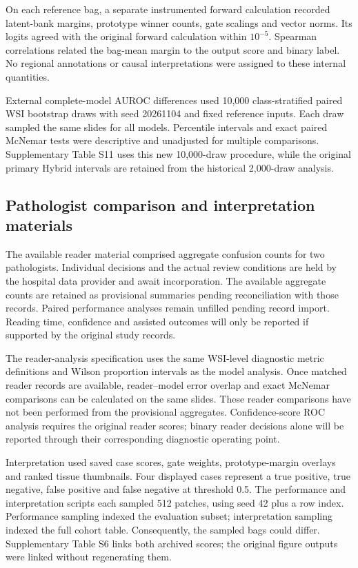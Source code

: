 On each reference bag, a separate instrumented forward calculation recorded latent-bank margins, prototype winner counts, gate scalings and vector norms. Its logits agreed with the original forward calculation within $10^{-5}$. Spearman correlations related the bag-mean margin to the output score and binary label. No regional annotations or causal interpretations were assigned to these internal quantities.

External complete-model AUROC differences used 10,000 class-stratified paired WSI bootstrap draws with seed 20261104 and fixed reference inputs. Each draw sampled the same slides for all models. Percentile intervals and exact paired McNemar tests were descriptive and unadjusted for multiple comparisons. Supplementary Table S11 uses this new 10,000-draw procedure, while the original primary Hybrid intervals are retained from the historical 2,000-draw analysis.


\subsection{Pathologist comparison and interpretation materials}

The available reader material comprised aggregate confusion counts for two pathologists. Individual decisions and the actual review conditions are held by the hospital data provider and await incorporation. The available aggregate counts are retained as provisional summaries pending reconciliation with those records.  Paired performance analyses remain unfilled pending record import. Reading time, confidence and assisted outcomes will only be reported if supported by the original study records.

The reader-analysis specification uses the same WSI-level diagnostic metric definitions and Wilson proportion intervals as the model analysis. Once matched reader records are available, reader--model error overlap and exact McNemar comparisons can be calculated on the same slides. These reader comparisons have not been performed from the provisional aggregates. Confidence-score ROC analysis requires the original reader scores; binary reader decisions alone will be reported through their corresponding diagnostic operating point.

Interpretation used saved case scores, gate weights, prototype-margin overlays and ranked tissue thumbnails. Four displayed cases represent a true positive, true negative, false positive and false negative at threshold 0.5. The performance and interpretation scripts each sampled 512 patches, using seed 42 plus a row index. Performance sampling indexed the evaluation subset; interpretation sampling indexed the full cohort table. Consequently, the sampled bags could differ. Supplementary Table S6 links both archived scores; the original figure outputs were linked without regenerating them.

